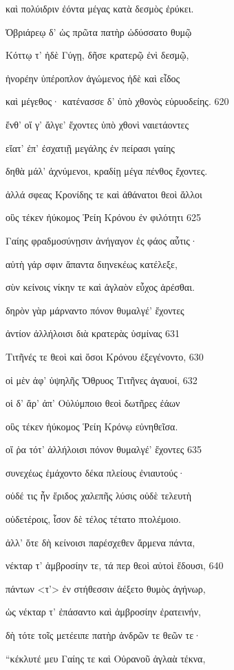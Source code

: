 καὶ πολύιδριν ἐόντα μέγας κατὰ δεσμὸς ἐρύκει.

Ὀβριάρεῳ δ' ὡς πρῶτα πατὴρ ὠδύσσατο θυμῷ 

Κόττῳ τ' ἠδὲ Γύγῃ, δῆσε κρατερῷ ἐνὶ δεσμῷ, 

ἠνορέην ὑπέροπλον ἀγώμενος ἠδὲ καὶ εἶδος

καὶ μέγεθος· κατένασσε δ' ὑπὸ χθονὸς εὐρυοδείης. 620 

ἔνθ' οἵ γ' ἄλγε' ἔχοντες ὑπὸ χθονὶ ναιετάοντες

εἵατ' ἐπ' ἐσχατιῇ μεγάλης ἐν πείρασι γαίης 

δηθὰ μάλ' ἀχνύμενοι, κραδίῃ μέγα πένθος ἔχοντες.

ἀλλά σφεας Κρονίδης τε καὶ ἀθάνατοι θεοὶ ἄλλοι 

οὓς τέκεν ἠύκομος Ῥείη Κρόνου ἐν φιλότητι 625 

Γαίης φραδμοσύνῃσιν ἀνήγαγον ἐς φάος αὖτις· 

αὐτὴ γάρ σφιν ἅπαντα διηνεκέως κατέλεξε, 

σὺν κείνοις νίκην τε καὶ ἀγλαὸν εὖχος ἀρέσθαι.

δηρὸν γὰρ μάρναντο πόνον θυμαλγέ' ἔχοντες

ἀντίον ἀλλήλοισι διὰ κρατερὰς ὑσμίνας 631   %

Τιτῆνές τε θεοὶ καὶ ὅσοι Κρόνου ἐξεγένοντο, 630

οἱ μὲν ἀφ' ὑψηλῆς Ὄθρυος Τιτῆνες ἀγαυοί, 632 

οἱ δ' ἄρ' ἀπ' Οὐλύμποιο θεοὶ δωτῆρες ἐάων 

οὓς τέκεν ἠύκομος Ῥείη Κρόνῳ εὐνηθεῖσα.

οἵ ῥα τότ' ἀλλήλοισι πόνον θυμαλγέ' ἔχοντες 635 

συνεχέως ἐμάχοντο δέκα πλείους ἐνιαυτούς· 

οὐδέ τις ἦν ἔριδος χαλεπῆς λύσις οὐδὲ τελευτὴ

οὐδετέροις, ἶσον δὲ τέλος τέτατο πτολέμοιο.

ἀλλ' ὅτε δὴ κείνοισι παρέσχεθεν ἄρμενα πάντα,

νέκταρ τ' ἀμβροσίην τε, τά περ θεοὶ αὐτοὶ ἔδουσι, 640

πάντων \textless{}τ'\textgreater{} ἐν στήθεσσιν ἀέξετο θυμὸς ἀγήνωρ,

ὡς νέκταρ τ' ἐπάσαντο καὶ ἀμβροσίην ἐρατεινήν,

δὴ τότε τοῖς μετέειπε πατὴρ ἀνδρῶν τε θεῶν τε·

``κέκλυτέ μευ Γαίης τε καὶ Οὐρανοῦ ἀγλαὰ τέκνα, 

